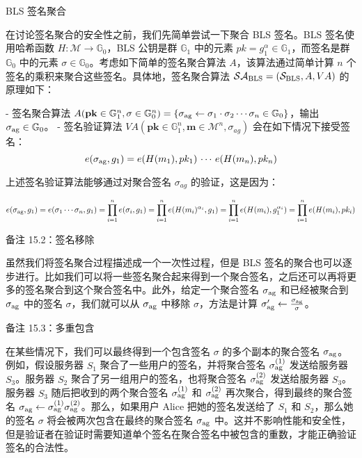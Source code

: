 BLS 签名聚合

在讨论签名聚合的安全性之前，我们先简单尝试一下聚合 BLS 签名。BLS 签名使用哈希函数 $H: \mathcal{M} \rightarrow \mathbb{G}_0$，BLS 公钥是群 $\mathbb{G}_1$ 中的元素 $pk=g_1^\alpha \in \mathbb{G}_1$，而签名是群 $\mathbb{G}_0$ 中的元素 $\sigma \in \mathbb{G}_0$。考虑如下简单的签名聚合算法 $A$，该算法通过简单计算 $n$ 个签名的乘积来聚合这些签名。具体地，签名聚合算法 $\mathcal{SA}_{\rm BLS}=(\mathcal{S}_{\rm BLS},A,VA)$ 的原理如下：

- 签名聚合算法 $A(\mathbf{pk}\in\mathbb{G}_1^n,\mathbf\sigma\in\mathbb{G}_0^n) = \{\sigma_{\rm ag}\leftarrow \sigma_1 \cdot \sigma_2 \cdots \sigma_n \in \mathbb{G}_0\}$，输出 $\sigma_{\rm ag}\in\mathbb{G}_0$。
- 签名验证算法 $VA(\mathbf{pk}\in\mathbb{G}_1^n,\mathbf{m}\in\mathcal{M}^n,\sigma_{ag})$ 会在如下情况下接受签名：
    \[
    e(\sigma_{\rm ag},g_1)=e(H(m_1),pk_1)\,\cdots\,e(H(m_n),pk_n)
    \]
    

上述签名验证算法能够通过对聚合签名 $\sigma_{ag}$ 的验证，这是因为：

\[
e(\sigma_{\rm ag},g_1)=e(\sigma_1\cdots\sigma_n,g_1) = \prod_{i=1}^{n}e(\sigma_i,g_1)=\prod_{i=1}^{n}e(H(m_i)^{\alpha_i},g_1)\\
=\prod_{i=1}^{n}e(H(m_i),g_1^{\alpha_i}) = \prod_{i=1}^{n}e(H(m_i),pk_i)
\]

备注 15.2：签名移除

虽然我们将签名聚合过程描述成一个一次性过程，但是 BLS 签名的聚合也可以逐步进行。比如我们可以将一些签名聚合起来得到一个聚合签名，之后还可以再将更多的签名聚合到这个聚合签名中。此外，给定一个聚合签名 $\sigma_{\rm ag}$ 和已经被聚合到 $\sigma_{\rm ag}$ 中的签名 $\sigma$，我们就可以从 $\sigma_{\rm ag}$ 中移除 $\sigma$，方法是计算 $\sigma_{\rm ag}'\leftarrow \frac{\sigma_{\rm ag}}{\sigma}$。

备注 15.3：多重包含

在某些情况下，我们可以最终得到一个包含签名 $\sigma$ 的多个副本的聚合签名 $\sigma_{\rm ag}$。例如，假设服务器 $S_1$ 聚合了一些用户的签名，并将聚合签名 $\sigma_{\rm ag}^{(1)}$ 发送给服务器 $S_3$。服务器 $S_2$ 聚合了另一组用户的签名，也将聚合签名 $\sigma_{\rm ag}^{(2)}$ 发送给服务器 $S_3$。服务器 $S_3$ 随后把收到的两个聚合签名 $\sigma_{\rm ag}^{(1)}$ 和 $\sigma_{\rm ag}^{(2)}$ 再次聚合，得到最终的聚合签名 $\sigma_{\rm ag}\leftarrow \sigma_{\rm ag}^{(1)} \sigma_{\rm ag}^{(2)}$。那么，如果用户 Alice 把她的签名发送给了 $S_1$ 和 $S_2$，那么她的签名 $\sigma$ 将会被两次包含在最终的聚合签名 $\sigma_{\rm ag}$ 中。这并不影响性能和安全性，但是验证者在验证时需要知道单个签名在聚合签名中被包含的重数，才能正确验证签名的合法性。

